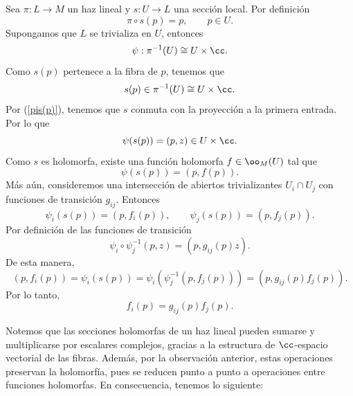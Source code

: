 	\begin{remark}\label{seccionlocalholomorfa}
		Sea $\pi:L\to M$ un haz lineal y $s:U\to L$ una sección local. Por definición
		\begin{equation}\label{pis(p)}
			\pi \circ s(p)=p,\qquad p\in U.
		\end{equation} 
		Supongamos que $L$ se trivializa en $U$, entonces
		\begin{equation*}
			\psi:\pi^{-1}(U)\cong U\times \cc.
		\end{equation*}
		Como $s(p)$ pertenece a la fibra de $p$, tenemos que
		\begin{equation*}
			s(p)\in \pi^{-1}(U)\cong U\times \cc.
		\end{equation*}
		Por (\ref{pis(p)}), tenemos que $s$ conmuta con la proyección a la primera entrada. Por lo que
		\begin{equation*}
			\psi(s(p))=(p,z)\in U\times \cc.
		\end{equation*}
		Como $s$ es holomorfa, existe una función holomorfa $f\in \oo_M(U)$ tal que
		\begin{equation*}
			\psi(s(p))=(p,f(p)).
		\end{equation*}
		Más aún, consideremos una intersección de abiertos trivializantes $U_i\cap U_j$ con funciones de transición $g_{ij}$. Entonces
		\begin{equation*}
			\psi_i(s(p))=(p,f_i(p)),\qquad \psi_j(s(p))=(p,f_j(p)).
		\end{equation*}
		Por definición de las funciones de transición
		\begin{equation*}
			\psi_i\circ \psi_j^{-1}(p,z)=(p,g_{ij}(p)z).
		\end{equation*}
		De esta manera,
		\begin{equation*}
			(p,f_i(p))=\psi_i(s(p))=\psi_i(\psi_j^{-1}(p,f_j(p)))=(p,g_{ij}(p)f_j(p)).
		\end{equation*}
		Por lo tanto, 
		\begin{equation*}
			f_i(p)=g_{ij}(p)f_j(p).
		\end{equation*}
	\end{remark}
	
	Notemos que las secciones holomorfas de un haz lineal pueden sumarse y multiplicarse por escalares complejos, gracias a la estructura de $\cc$-espacio vectorial de las fibras. Además, por la observación anterior, estas operaciones preservan la holomorfía, pues se reducen punto a punto a operaciones entre funciones holomorfas. En consecuencia, tenemos lo siguiente:
	
